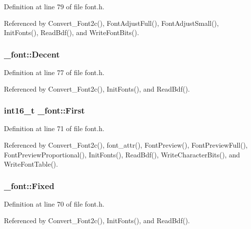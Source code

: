 Definition at line 79 of file font.\-h.



Referenced by Convert\-\_\-\-Font2c(), Font\-Adjust\-Full(), Font\-Adjust\-Small(), Init\-Fonts(), Read\-Bdf(), and Write\-Font\-Bits().

\hypertarget{struct__font_a7f3567884a6aa454b7414b10dba35755}{
\subsubsection[{Decent}]{ \-\_\-font\-::\-Decent}}\label{struct__font_a7f3567884a6aa454b7414b10dba35755}


Definition at line 77 of file font.\-h.



Referenced by Convert\-\_\-\-Font2c(), Init\-Fonts(), and Read\-Bdf().

\hypertarget{struct__font_a73decb2a2c2880dc782cd9cda5561876}{
\subsubsection[{First}]{\setlength{\rightskip}{0pt plus 5cm}int16\-\_\-t \-\_\-font\-::\-First}}\label{struct__font_a73decb2a2c2880dc782cd9cda5561876}


Definition at line 71 of file font.\-h.



Referenced by Convert\-\_\-\-Font2c(), font\-\_\-attr(), Font\-Preview(), Font\-Preview\-Full(), Font\-Preview\-Proportional(), Init\-Fonts(), Read\-Bdf(), Write\-Character\-Bits(), and Write\-Font\-Table().

\hypertarget{struct__font_a76218c6b35acb78926429f247cbaa687}{
\subsubsection[{Fixed}]{ \-\_\-font\-::\-Fixed}}\label{struct__font_a76218c6b35acb78926429f247cbaa687}


Definition at line 70 of file font.\-h.



Referenced by Convert\-\_\-\-Font2c(), Init\-Fonts(), and Read\-Bdf().

